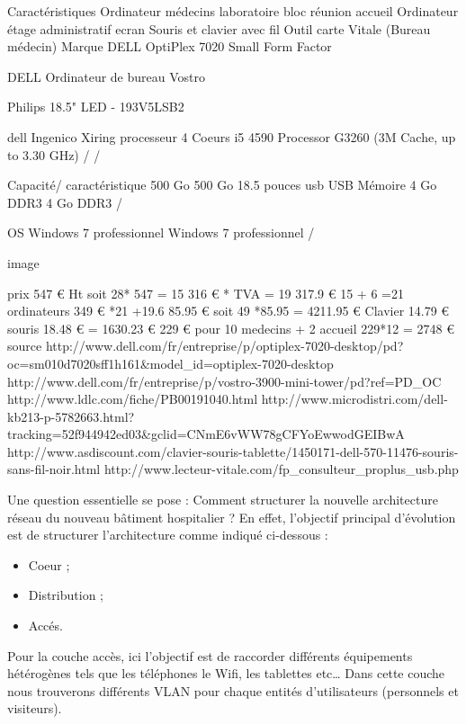 Caractéristiques
    Ordinateur
médecins
laboratoire
bloc
réunion
accueil
    Ordinateur étage
administratif
    ecran
    Souris et clavier avec fil
    Outil carte Vitale (Bureau médecin)
    Marque
    DELL OptiPlex 7020 Small Form Factor


    DELL Ordinateur de bureau Vostro


    Philips 18.5" LED - 193V5LSB2


    dell
    Ingenico Xiring
    processeur
    4 Coeurs i5 4590
    Processor G3260 (3M Cache, up to 3.30 GHz)
    /
    /


    Capacité/ caractéristique
    500 Go
    500 Go
    18.5 pouces
    usb
    USB
    Mémoire
    4 Go DDR3
    4 Go DDR3
    /




    OS
    Windows 7 professionnel
    Windows 7 professionnel
    /




    image











    prix
    547 € Ht
soit 28* 547 = 15 316 € * TVA = 19 317.9 €
    15 + 6 =21 ordinateurs
349 € *21 +19.6%
    85.95 €
soit 49 *85.95 = 4211.95 €
    Clavier 14.79 €
souris 18.48 €
= 1630.23 €
    229 €
pour 10 medecins + 2 accueil
229*12 = 2748 €
    source
    http://www.dell.com/fr/entreprise/p/optiplex-7020-desktop/pd?oc=sm010d7020sff1h161&model_id=optiplex-7020-desktop
    http://www.dell.com/fr/entreprise/p/vostro-3900-mini-tower/pd?ref=PD_OC
    http://www.ldlc.com/fiche/PB00191040.html
    http://www.microdistri.com/dell-kb213-p-5782663.html?tracking=52f944942ed03&gclid=CNmE6vWW78gCFYoEwwodGEIBwA
http://www.asdiscount.com/clavier-souris-tablette/1450171-dell-570-11476-souris-sans-fil-noir.html
    http://www.lecteur-vitale.com/fp_consulteur_proplus_usb.php




















Une question essentielle se pose : Comment structurer la nouvelle architecture réseau du nouveau bâtiment hospitalier ?
En effet, l’objectif principal d’évolution est de structurer l’architecture comme indiqué ci-dessous :
\begin{itemize}
\item Coeur ;
\item Distribution ;
\item Accés.
\end{itemize}
Pour la couche accès, ici l’objectif est de raccorder différents équipements hétérogènes tels que les téléphones le Wifi, les tablettes etc…
Dans cette couche nous trouverons différents VLAN pour chaque entités d’utilisateurs (personnels et visiteurs).

